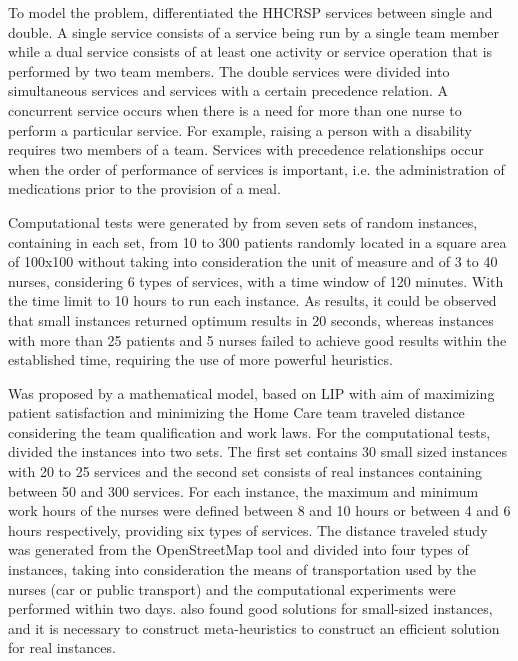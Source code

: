 To model the problem,  differentiated the \ac{HHCRSP} services between single and double.
A single service consists of a service being run by a single team member while a dual service consists of at least one activity or service operation that is performed by two team members.
The double services were divided into simultaneous services and services with a certain precedence relation.
A concurrent service occurs when there is a need for more than one nurse to perform a particular service. For example, raising a person with a disability requires two members of a team.
Services with precedence relationships occur when the order of performance of services is important, i.e. the administration of medications prior to the provision of a meal.

Computational tests were generated by  from seven sets of random instances, containing in each set, from 10 to 300 patients randomly located in a square area of 100x100 without taking into consideration the unit of measure and of 3 to 40 nurses, considering 6 types of services, with a time window of 120 minutes. With the time limit to 10 hours to run each instance.
As results, it could be observed that small instances returned optimum results in 20 seconds, whereas instances with more than 25 patients and 5 nurses failed to achieve good results within the established time, requiring the use of more powerful heuristics.

Was proposed by  a mathematical model, based on \ac{LIP} with aim of maximizing patient satisfaction and minimizing the Home Care team traveled distance considering the team qualification and work laws.
For the computational tests,  divided the instances into two sets. The first set contains 30 small sized instances with 20 to 25 services and the second set consists of real instances containing between 50 and 300 services. For each instance, the maximum and minimum work hours of the nurses were defined between 8 and 10 hours or between 4 and 6 hours respectively, providing six types of services.
The distance traveled study was generated from the OpenStreetMap tool and divided into four types of instances, taking into consideration the means of transportation used by the nurses (car or public transport) and the computational experiments were performed within two days. \cite{tricoire:2016} also found good solutions for small-sized instances, and it is necessary to construct meta-heuristics to construct an efficient solution for real instances.

